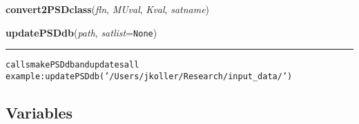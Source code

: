     \label{spacepy:satdata:convert2PSDclass}

    \vspace{0.5ex}

\hspace{.8\funcindent}\begin{boxedminipage}{\funcwidth}

    \raggedright \textbf{convert2PSDclass}(\textit{fln}, \textit{MUval}, \textit{Kval}, \textit{satname})

\setlength{\parskip}{2ex}
\setlength{\parskip}{1ex}
    \end{boxedminipage}

    \label{spacepy:satdata:updatePSDdb}

    \vspace{0.5ex}

\hspace{.8\funcindent}\begin{boxedminipage}{\funcwidth}

    \raggedright \textbf{updatePSDdb}(\textit{path}, \textit{satlist}={\tt None})

    \vspace{-1.5ex}

    \rule{\textwidth}{0.5\fboxrule}
\setlength{\parskip}{2ex}
\begin{alltt}

calls makePSDdb and updates all
    example: updatePSDdb('/Users/jkoller/Research/input\_data/')
\end{alltt}

\setlength{\parskip}{1ex}
    \end{boxedminipage}



  \subsection{Variables}

